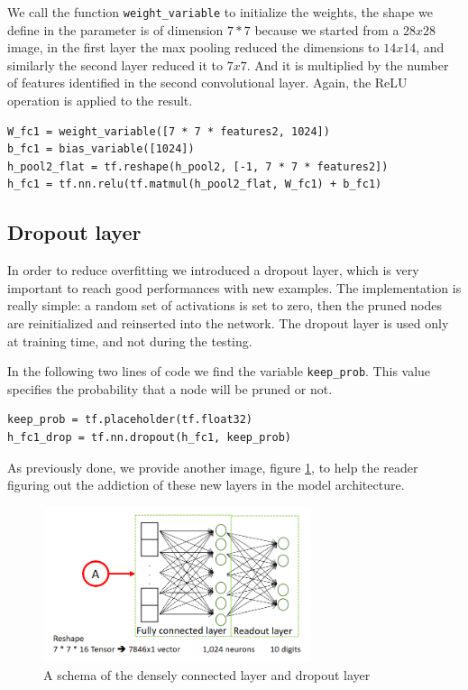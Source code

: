 We call the function \lstinline|weight_variable| to initialize the weights, the shape we define in the parameter is of dimension $7*7$ because we started from a $28x28$ image, in the first layer the max pooling reduced the dimensions to $14x14$, and similarly the second layer reduced it to $7x7$. And it is multiplied by the number of features identified in the second convolutional layer.
Again, the \acs{ReLU} operation is applied to the result.

\begin{lstlisting}
W_fc1 = weight_variable([7 * 7 * features2, 1024])
b_fc1 = bias_variable([1024])
h_pool2_flat = tf.reshape(h_pool2, [-1, 7 * 7 * features2])
h_fc1 = tf.nn.relu(tf.matmul(h_pool2_flat, W_fc1) + b_fc1)
\end{lstlisting}

\subsection{Dropout layer}

In order to reduce overfitting we introduced a dropout layer, which is very important to reach good performances with new examples. The implementation is really simple: a random set of activations is set to zero, then the pruned nodes are reinitialized and reinserted into the network. The dropout layer is used only at training time, and not during the testing.

In the following two lines of code we find the variable \lstinline|keep_prob|. This value specifies the probability that a node will be pruned or not.

\begin{lstlisting}
keep_prob = tf.placeholder(tf.float32)
h_fc1_drop = tf.nn.dropout(h_fc1, keep_prob)
\end{lstlisting}

As previously done, we provide another image, figure \ref{fig:other_layers}, to help the reader figuring out the addiction of these new layers in the model architecture.

\begin{figure}
	\centering
	\includegraphics[width=0.7\textwidth]{Images/other_layers}
	\caption{A schema of the densely connected layer and dropout layer}
	\label{fig:other_layers}
\end{figure}

